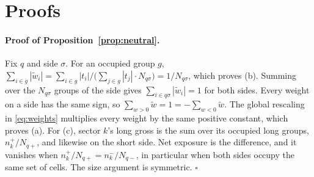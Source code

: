 \documentclass[11pt]{article}
\theoremstyle{definition}
\newcommand{\1}{\mathbf{1}}
\begin{document}
\vspace{1em}
\noindent{}

\appendix
\section{Proofs}\label{app:proofs}

\paragraph{Proof of Proposition~\ref{prop:neutral}.}
Fix $q$ and side $\sigma$. For an occupied group $g$,
$\sum_{i\in g}|\tilde w_i|=\sum_{i\in g}|t_i|\big/\big(\sum_{j\in g}|t_j|\cdot N_{q\sigma}\big)=1/N_{q\sigma}$,
which proves (b). Summing over the $N_{q\sigma}$ groups of the side gives
$\sum_{i\in q\sigma}|\tilde w_i|=1$ for both sides. Every weight on a side has the same sign,
so $\sum_{w>0}\tilde w=1=-\sum_{w<0}\tilde w$. The global rescaling in \eqref{eq:weights}
multiplies every weight by the same positive constant, which proves (a). For (c), sector
$k$'s long gross is the sum over its occupied long groups, $n^+_k/N_{q+}$, and likewise on
the short side. Net exposure is the difference, and it vanishes when
$n^{+}_{k}/N_{q+}=n^{-}_{k}/N_{q-}$, in particular when both sides occupy the same set of
cells. The size argument is symmetric. $\square$
\end{document}
